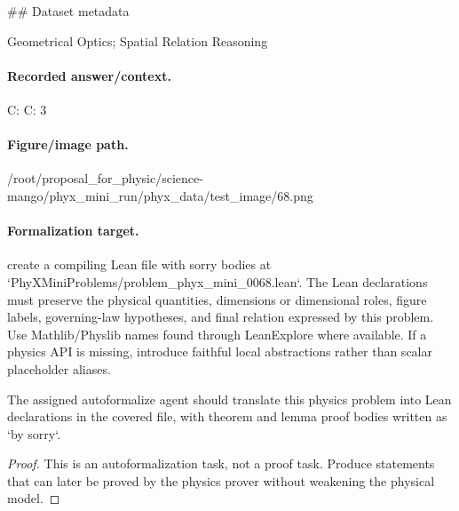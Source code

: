 \#\# Dataset metadata

Geometrical Optics; Spatial Relation Reasoning

\paragraph{Recorded answer/context.}
C: C: 3

\paragraph{Figure/image path.}
/root/proposal\_for\_physic/science-mango/phyx\_mini\_run/phyx\_data/test\_image/68.png

\paragraph{Formalization target.}
create a compiling Lean file with sorry bodies at `PhyXMiniProblems/problem\_phyx\_mini\_0068.lean`. The Lean declarations must preserve the physical quantities, dimensions or dimensional roles, figure labels, governing-law hypotheses, and final relation expressed by this problem.
Use Mathlib/Physlib names found through LeanExplore where available. If a physics API is missing, introduce faithful local abstractions rather than scalar placeholder aliases.

\begin{theorem}
\label{thm:physics:phyx_mini_0068:target}
The assigned autoformalize agent should translate this physics problem into Lean declarations in the covered file, with theorem and lemma proof bodies written as `by sorry`.
\end{theorem}
\begin{proof}
This is an autoformalization task, not a proof task. Produce statements that can later be proved by the physics prover without weakening the physical model.
\end{proof}


